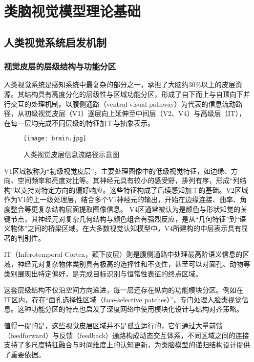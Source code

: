 
\chapter{类脑视觉模型理论基础}

\section{人类视觉系统启发机制}

\subsection{视觉皮层的层级结构与功能分区}

人类视觉系统是感知系统中最复杂的部分之一，承担了大脑约30\%以上的皮层资源。其结构具有高度分化的层级性与区域功能分区，形成了自下而上与自顶向下并行交互的处理机制。以腹侧通路（ventral visual pathway）为代表的信息流动路径，从初级视觉皮层（V1）逐层向上延伸至中间层（V2、V4）与高级层（IT），在每一层均完成不同层级的特征加工与抽象表示\cite{ kanwisher2010functional}。

\begin{figure}[hbt]
	\centering
	\texttt{[image: brain.jpg]}
	\caption{人类视觉皮层信息流路径示意图}
	\label{f.naoquyu}
\end{figure}

V1区域被称为“初级视觉皮层”，主要处理图像中的低级视觉特征，如边缘、方向、空间频率和亮度对比等。其神经元具有较小的感受野，排列有序，形成“列结构”以支持对特定方向的偏好响应。这些特征构成了后续感知加工的基础。V2区域作为V1的上一级处理层，结合多个V1神经元的输出，开始在边缘连接、曲率、角度整合等更复杂结构层面提取图像信息。
V4区通常被认为是颜色与形状知觉的关键节点，其神经元对复杂几何结构与颜色组合有强烈反应，是从“几何特征”到“语义物体”之间的桥梁区域。在大多数视觉认知模型中，V4所建构的中层表示具有显著的判别性。

IT（Inferotemporal Cortex，颞下皮层）则是腹侧通路中处理最高阶语义信息的区域，神经元对复杂物体类别具有极高的选择性和不变性，甚至可以对面孔、动物等类别展现出特定偏好，是完成目标识别与恒常性表征的终点区域。

这套层级结构不仅沿空间方向递进，每一层还存在纵向的功能模块分区。例如在IT区内，存在“面孔选择性区域（face-selective patches）”，专门处理人脸类视觉信息。这种功能分区的特点也启发了深度网络中使用模块化设计与结构对齐策略。

值得一提的是，这些视觉皮层区域并不是孤立运行的，它们通过大量前馈（feedforward）与反馈（feedback）通路构成动态交互体系，不同区域之间的连接支持了多尺度特征融合与时间维度上的认知更新，为类脑模型的递归结构设计提供了重要依据\cite{yamins2016using}。

